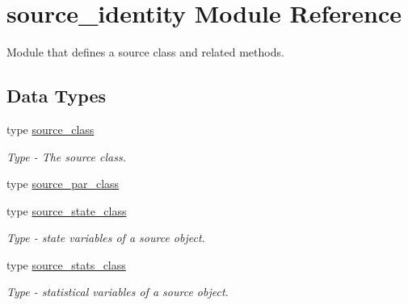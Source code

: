 \hypertarget{namespacesource__identity}{}\section{source\+\_\+identity Module Reference}
\label{namespacesource__identity}


Module that defines a source class and related methods.  


\subsection*{Data Types}
\begin{DoxyCompactItemize}
\item 
type \mbox{\hyperlink{structsource__identity_1_1source__class}{source\+\_\+class}}
\begin{DoxyCompactList}\small\item\em Type -\/ The source class. \end{DoxyCompactList}\item 
type \mbox{\hyperlink{structsource__identity_1_1source__par__class}{source\+\_\+par\+\_\+class}}
\item 
type \mbox{\hyperlink{structsource__identity_1_1source__state__class}{source\+\_\+state\+\_\+class}}
\begin{DoxyCompactList}\small\item\em Type -\/ state variables of a source object. \end{DoxyCompactList}\item 
type \mbox{\hyperlink{structsource__identity_1_1source__stats__class}{source\+\_\+stats\+\_\+class}}
\begin{DoxyCompactList}\small\item\em Type -\/ statistical variables of a source object. \end{DoxyCompactList}\end{DoxyCompactItemize}
